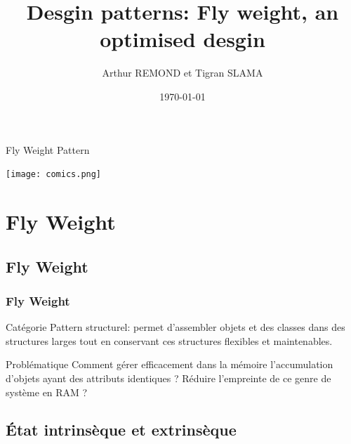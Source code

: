 \documentclass{beamer}
\title[Desgin pattern Fly Weight]{Desgin patterns: Fly weight, an optimised desgin} %
\author{Arthur REMOND et Tigran SLAMA} %
\institute[ULCO] %
{
Universite du Littoral Cote d'Opale \\ %
\medskip
\textit{} %
}
\date{\today} %
\begin{document}
\begin{frame}
\titlepage %
\end{frame}

\begin{frame}
 \tableofcontents
\end{frame}

\begin{frame}{Fly Weight Pattern}
    \begin{center}
        \texttt{[image: comics.png]}
    \end{center}
\end{frame}


\section{Fly Weight}

\subsection{Fly Weight}
\begin{frame}
\frametitle{Fly Weight}
\begin{block}{Catégorie}
Pattern structurel: permet d'assembler objets et des classes dans des structures larges tout en conservant ces structures flexibles et maintenables.
\end{block}
\begin{block}{Problématique}
Comment gérer efficacement dans la mémoire l'accumulation d'objets ayant des attributs identiques ? Réduire l'empreinte de ce genre de système en RAM ?
\end{block}

\end{frame}

\subsection{État intrinsèque et extrinsèque}
\end{document}
